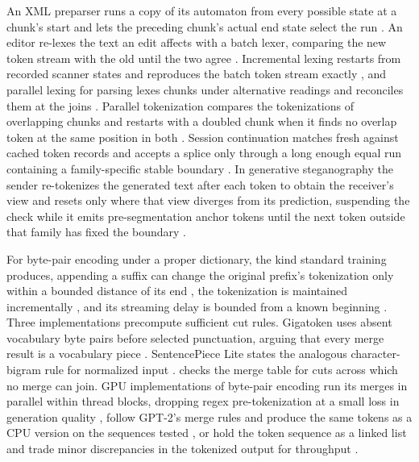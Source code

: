 \documentclass[11pt,a4paper]{article}
\theoremstyle{definition}
\theoremstyle{plain}
\begin{document}
An XML preparser runs a copy of its automaton from every possible state at a chunk's start and lets the preceding
chunk's actual end state select the run \citep{chiu2014metadfa}. An editor re-lexes the text an edit affects with a
batch lexer, comparing the new token stream with the old until the two agree \citep{vandevanter1998incremental}.
Incremental lexing restarts from recorded scanner states and reproduces the batch token stream exactly
\citep{wagner1997lexing}, and parallel lexing for parsing lexes chunks under alternative readings and reconciles them at
the joins \citep{barenghi2015parallel}. Parallel tokenization compares the tokenizations of overlapping chunks and
restarts with a doubled chunk when it finds no overlap token at the same position in both \citep{shao2026lopt}. Session
continuation matches fresh against cached token records and accepts a splice only through a long enough equal run
containing a family-specific stable boundary \citep{zhang2026toktier}. In generative steganography the sender
re-tokenizes the generated text after each token to obtain the receiver's view and resets only where that view diverges
from its prediction, suspending the check while it emits pre-segmentation anchor tokens until the next token outside
that family has fixed the boundary \citep{wang2026retoksync}.

For byte-pair encoding under a proper dictionary, the kind standard training produces, appending a suffix can change the
original prefix's tokenization only within a bounded distance of its end \citep{berglund2023formalizing}, the
tokenization is maintained incrementally \citep{jiang2026incremental}, and its streaming delay is bounded from a known
beginning \citep{mamouras2026bpedelay}. Three implementations precompute sufficient cut rules. Gigatoken uses absent
vocabulary byte pairs before selected punctuation, arguing that every merge result is a vocabulary piece
\citep{rod2026gigatoken}. SentencePiece Lite states the analogous character-bigram rule for normalized input
\citep{sentencepiecelite2026}. \citet{xu2026parallel} checks the merge table for cuts across which no merge can join.
GPU implementations of byte-pair encoding run its merges in parallel within thread blocks, dropping regex
pre-tokenization at a small loss in generation quality \citep{you2025blockbpe}, follow GPT-2's merge rules and produce
the same tokens as a CPU version on the sequences tested \citep{kadamba2026gputok}, or hold the token sequence as a
linked list and trade minor discrepancies in the tokenized output for throughput \citep{kovilur2026llbpe}.
\end{document}
